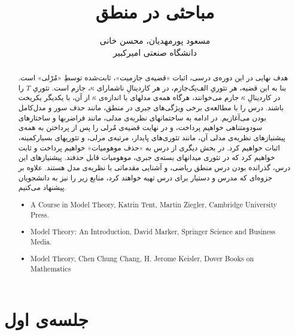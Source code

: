 \documentclass[12pt,a4paper]{article}
\title{مباحثی در منطق}
\author{مسعود پورمهدیان، محسن خانی\\
دانشگاه صنعتی امیرکبیر
}
\theoremstyle{colorhead}
\begin{document}
\sloppy 
\maketitle
\begin{abstract}
هدف نهایی در این دوره‌ی درسی، اثبات «قضیه‌ی جازمیت»، ثابت‌شده توسطِ «مُرْلی» است. بنا به این قضیه، هر تئوریِ الف‌یک‌جازم، در هر کاردینالِ ناشمارای 
$\kappa$،
 جازم است. تئوریِ
 $T$
  را در کاردینالِ 
  $\kappa$
   جازم می‌خوانند، هرگاه همه‌ی مدلهای با اندازه‌ی
  $\kappa$
    از آن، با یکدیگر یکریخت باشند.
درس را با مطالعه‌ی برخی ویژگی‌های جبری در منطق، مانند حذف سور و مدل‌کامل بودن می‌آغازیم. در ادامه به ساختمانهای نظریه‌ی مدلی، مانند فراضربها و ساختارهای سودومتناهی خواهیم پرداخت، و در نهایت قضیه‌ی مُرلی را پس از پرداختن به همه‌ی پیشنیازهای نظریه‌ی مدلی آن، مانند تئوری‌های پایدار، مرتبه‌ی مرلی، و تئوریهای بسیارکمینه، اثبات خواهیم کرد. در بخش دیگری از درس به «حذف موهومیات»‌ خواهیم پرداخت و ثابت خواهیم کرد که در تئوری میدانهای بسته‌ی جبری، موهومیات قابل‌ حذفند. پیشنیازهای این درس، گذرانده بودن درس منطق ریاضی، و آشنایی مقدماتی با نظریه‌ی مدل هستند. علاوه‌ بر جزوه‌ای که مدرس و دستیار برای درس تهیه خواهند کرد، منابع زیر 
را نیز به دانشجویان پیشنهاد می‌کنیم.
\begin{latin}
\begin{itemize}
\item 
    A Course in Model Theory, Katrin Tent, Martin Ziegler, Cambridge University Press.
\item
Model Theory: An Introduction, David Marker, Springer Science and Business Media.
\item  
Model Theory, Chen Chung Chang, H. Jerome Keisler, Dover Books on Mathematics
\end{itemize}
    \end{latin}
\end{abstract}
\tableofcontents
\pagebreak 

\section{جلسه‌ی اول}
\end{document}
